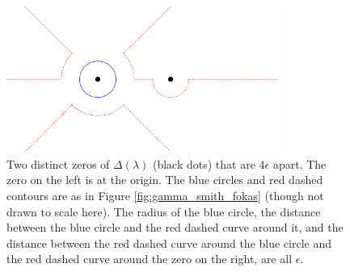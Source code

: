\documentclass[12pt, oneside, a4paper]{article}
\begin{document}
\begin{figure}[htpb!]
    \centering
    \includegraphics[width=0.8\textwidth]{epsilon_2_ps.png}
    \caption{Two distinct zeros of $\Delta(\lambda)$ (black dots) that are $4\epsilon$ apart. The zero on the left is at the origin. The blue circles and red dashed contours are as in Figure \ref{fig:gamma_smith_fokas} (though not drawn to scale here). The radius of the blue circle, the distance between the blue circle and the red dashed curve around it, and the distance between the red dashed curve around the blue circle and the red dashed curve around the zero on the right, are all $\epsilon$.}
    \label{fig:epsilon_2}
\end{figure}
\end{document}
